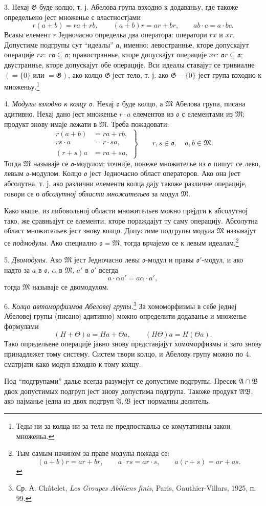 ﻿\documentclass[11pt]{article}
\providecommand{\mG}{\mathfrak{G}}
\providecommand{\mA}{\mathfrak{A}}
\providecommand{\mB}{\mathfrak{B}}
\providecommand{\mM}{\mathfrak{M}}
\providecommand{\mo}{\mathfrak{o}}
\begin{document}
3. Нехај $\mG$ буде колцо, т. ј. Абелова група взходно к додаваньу, где такоже определьено јест множенье с властностјами
\[
        r(a+b)=ra+rb,\qquad (a+b)r=ar+br,\qquad ab\cdot c=a\cdot bc.
\]
Всакы елемент $r$ Једночасно определьа два оператора: оператори $rx$ и $xr$. Допустиме подгрупы сут “идеалы” $\mathfrak a$, именно: левостраннье, кторе допускајут операције $rx$: $r\mathfrak a\subseteq\mathfrak a$; правостраннье, кторе допускајут операције $xr$: $\mathfrak a r\subseteq\mathfrak a$; двустраннье, кторе допускајут обе операције. Вси идеалы ставајут се тривиалне $(=\{0\}\text{ или }=\mG)$, ако колцо $\mG$ јест тело, т. ј. ако $\mG-\{0\}$ јест група взходно к множеньу.\footnote{Теды ни за колца ни за тела не предпоставльа се комутативны закон множеньа.}

4. \emph{Модулы взходно к колцу $\mo$.} Нехај $\mo$ буде колцо, а $\mM$ Абелова група, писана адитивно. Нехај дано јест множенье $r\cdot a$ елементов из $\mo$ с елементами из $\mM$; продукт знову имаје лежати в $\mM$. Треба пожадовати:
\[
\left.
\begin{aligned}
 r(a+b)&=ra+rb,\\
 rs\cdot a&=r\cdot sa,\\
 (r+s)a&=ra+sa,
\end{aligned}
\right\}\qquad r,s\in\mo,\quad a,b\in\mM.
\]
Тогда $\mM$ называје се $\mo$-модулом; точније, понеже множителье из $\mo$ пишут се лево, левым $\mo$-модулом. Колцо $\mo$ јест Једночасно област операторов. Ако она јест абсолутна, т. ј. ако различни елементи колца дају такоже различне операције, говори се о \emph{абсолутној области множительев} за модул $\mM$.

Како выше, из либовольној области множительев можно прејдти к абсолутној тако, же сравньајут се елементи, кторе пораждајут ту саму операцију. Абсолутна област множительев јест знову колцо. Допустиме подгрупы модула $\mM$ называјут се \emph{подмодулы}. Ако специално $\mo=\mM$, тогда врчајемо се к левым идеалам.\footnote{Тым самым начином за праве модулы пожада се:
\[
(a+b)r=ar+br,\qquad a\cdot rs=ar\cdot s,\qquad a(r+s)=ar+as.
\]}

5. \emph{Двомодулы.} Ако $\mM$ јест Једночасно левы $\mo$-модул и правы $\mo'$-модул, и ако надто за $a$ в $\mo$, $\alpha$ в $\mM$, $a'$ в $\mo'$ всегда
\[
        a\cdot\alpha a'=a\alpha\cdot a',
\]
тогда $\mM$ называје се двомодулом.

6. \emph{Колцо автоморфизмов Абеловеј групы.}\footnote{Ср. А. Châtelet, \emph{Les Groupes Abéliens finis}, Paris, Gauthier-Villars, 1925, п. 99.} За хомоморфизмы в себе једнеј Абеловеј групы (писаној адитивно) можно определити додаванье и множенье формулами
\[
        (H+\Theta)a=Ha+\Theta a,\qquad (H\Theta)a=H(\Theta a).
\]
Тако определьене операције јавно знову представјајут хомоморфизмы и зато знову принадлежет тому систему. Систем твори колцо, и Абелову групу можно по 4. сматрјати како модул взходно к тому колцу.

Под “подгрупами” далье всегда разумејут се допустиме подгрупы. Пресек $\mA\cap\mB$ двох допустимых подгруп јест знову допустима подгрупа. Такоже продукт $\mA\mB$, ако најманье једна из двох подгруп $\mA,\mB$ јест нормалны делитель.
\end{document}

